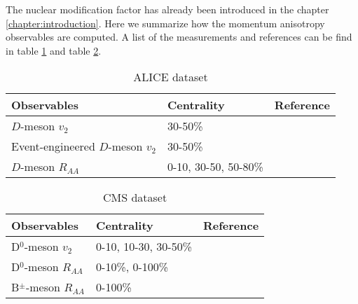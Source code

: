 The nuclear modification factor has already been introduced in the chapter \ref{chapter:introduction}. 
Here we summarize how the momentum anisotropy observables are computed.
A list of the measurements and references can be find in table \ref{table:ALICE-obs} and table \ref{table:CMS-obs}.
\begin{center}
\begin{table}[h]
\caption{ALICE dataset}\label{table:ALICE-obs} 
\begin{tabularx}{\columnwidth}{XXX}
\hline 
 Observables & Centrality & Reference\\ 
\hline 
$D$-meson $v_2$ & 30-50\% & \cite{Acharya:2017qps}\\ 
\hline 
Event-engineered $D$-meson $v_2$ & 30-50\% & \cite{Grosa:2017zcz}\\ 
\hline 
$D$-meson $R_{AA}$ & 0-10, 30-50, 50-80\% & \cite{Acharya:2018hre}\\
\hline 
\end{tabularx}
\end{table}
\begin{table}[h]
\caption{CMS dataset}\label{table:CMS-obs} 
\begin{tabularx}{\columnwidth}{XXX}
\hline 
Observables & Centrality & Reference\\ 
\hline 
D${}^0$-meson $v_2$ & 0-10, 10-30, 30-50\% & \cite{Sirunyan:2017plt}\\ 
\hline 
D${}^0$-meson $R_{AA}$ & 0-10\%, 0-100\% & \cite{Sirunyan:2017xss}\\ 
\hline 
B${}^{\pm}$-meson $R_{AA}$ & 0-100\% & \cite{Sirunyan:2017oug}\\ 
\hline 
\end{tabularx}
\end{table}
\end{center}

